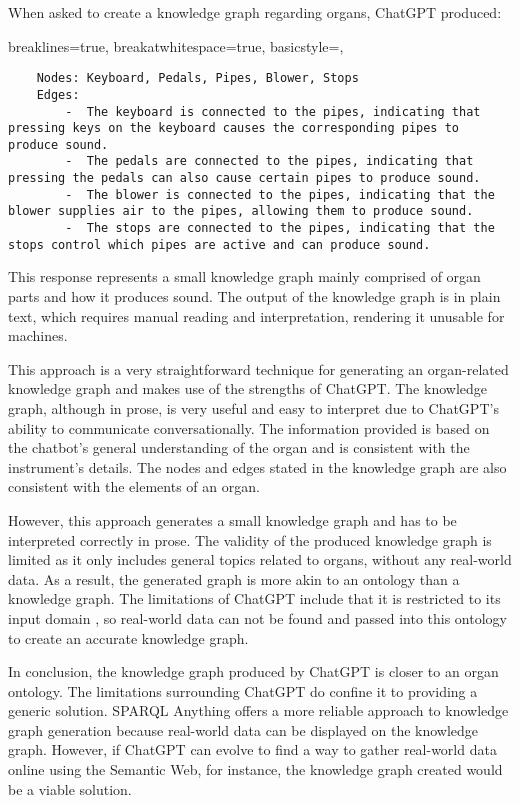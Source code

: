\noindent When asked to create a knowledge graph regarding organs, ChatGPT produced:

\lstset
{
    breaklines=true,
    breakatwhitespace=true,
    basicstyle=\linespread{1.5}\ttfamily,
}
\begin{lstlisting}
    Nodes: Keyboard, Pedals, Pipes, Blower, Stops
    Edges:
        -  The keyboard is connected to the pipes, indicating that pressing keys on the keyboard causes the corresponding pipes to produce sound.
        -  The pedals are connected to the pipes, indicating that pressing the pedals can also cause certain pipes to produce sound.
        -  The blower is connected to the pipes, indicating that the blower supplies air to the pipes, allowing them to produce sound.
        -  The stops are connected to the pipes, indicating that the stops control which pipes are active and can produce sound.
\end{lstlisting}

This response represents a small knowledge graph mainly comprised of organ parts and how it produces sound. The output of the knowledge graph is in plain text, which requires manual reading and interpretation, rendering it unusable for machines.

This approach is a very straightforward technique for generating an organ-related knowledge graph and makes use of the strengths of ChatGPT. The knowledge graph, although in prose, is very useful and easy to interpret due to ChatGPT's ability to communicate conversationally. The information provided is based on the chatbot's general understanding of the organ and is consistent with the instrument's details. The nodes and edges stated in the knowledge graph are also consistent with the elements of an organ. 

However, this approach generates a small knowledge graph and has to be interpreted correctly in prose. The validity of the produced knowledge graph is limited as it only includes general topics related to organs, without any real-world data. As a result, the generated graph is more akin to an ontology than a knowledge graph. The limitations of ChatGPT include that it is restricted to its input domain \cite{chatgptwebsite}, so real-world data can not be found and passed into this ontology to create an accurate knowledge graph. 

In conclusion, the knowledge graph produced by ChatGPT is closer to an organ ontology. The limitations surrounding ChatGPT do confine it to providing a generic solution. SPARQL Anything offers a more reliable approach to knowledge graph generation because real-world data can be displayed on the knowledge graph. However, if ChatGPT can evolve to find a way to gather real-world data online using the Semantic Web, for instance, the knowledge graph created would be a viable solution.
